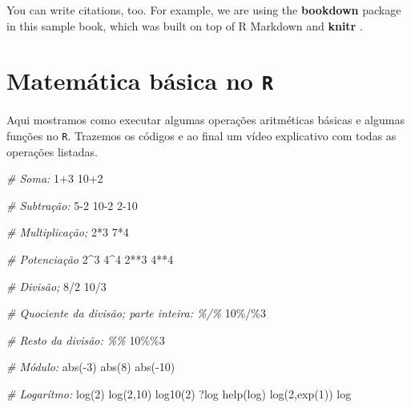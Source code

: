 \documentclass[
  brazilian,
]{book}
\newenvironment{Shaded}{\begin{snugshade}}{\end{snugshade}}
\newcommand{\CommentTok}[1]{\textcolor[rgb]{0.56,0.35,0.01}{\textit{#1}}}
\newcommand{\DecValTok}[1]{\textcolor[rgb]{0.00,0.00,0.81}{#1}}
\newcommand{\FunctionTok}[1]{\textcolor[rgb]{0.00,0.00,0.00}{#1}}
\newcommand{\NormalTok}[1]{#1}
\newcommand{\SpecialCharTok}[1]{\textcolor[rgb]{0.00,0.00,0.00}{#1}}
\begin{document}
You can write citations, too. For example, we are using the \textbf{bookdown} package \citep{R-bookdown} in this sample book, which was built on top of R Markdown and \textbf{knitr} \citep{xie2015}.

\hypertarget{matemuxe1tica-buxe1sica-no-r}{%
\chapter{\texorpdfstring{Matemática básica no \texttt{R}}{Matemática básica no R}}\label{matemuxe1tica-buxe1sica-no-r}}

Aqui mostramos como executar algumas operações aritméticas básicas e algumas funções no \texttt{R}. Trazemos os códigos e ao final um vídeo explicativo com todas as operações listadas.

\begin{Shaded}
\begin{Highlighting}[]
\CommentTok{\# Soma:}
\DecValTok{1}\SpecialCharTok{+}\DecValTok{3}
\DecValTok{10}\SpecialCharTok{+}\DecValTok{2}

\CommentTok{\# Subtração:}
\DecValTok{5{-}2}
\DecValTok{10{-}2}
\DecValTok{2{-}10}

\CommentTok{\# Multiplicação;}
\DecValTok{2}\SpecialCharTok{*}\DecValTok{3}
\DecValTok{7}\SpecialCharTok{*}\DecValTok{4}

\CommentTok{\# Potenciação}
\DecValTok{2}\SpecialCharTok{\^{}}\DecValTok{3}
\DecValTok{4}\SpecialCharTok{\^{}}\DecValTok{4}
\DecValTok{2}\SpecialCharTok{**}\DecValTok{3}
\DecValTok{4}\SpecialCharTok{**}\DecValTok{4}

\CommentTok{\# Divisão;}
\DecValTok{8}\SpecialCharTok{/}\DecValTok{2}
\DecValTok{10}\SpecialCharTok{/}\DecValTok{3}

\CommentTok{\# Quociente da divisão; parte inteira: \%/\%}
\DecValTok{10}\SpecialCharTok{\%/\%}\DecValTok{3}

\CommentTok{\# Resto da divisão: \%\%}
\DecValTok{10}\SpecialCharTok{\%\%}\DecValTok{3}

\CommentTok{\# Módulo:}
\FunctionTok{abs}\NormalTok{(}\SpecialCharTok{{-}}\DecValTok{3}\NormalTok{)}
\FunctionTok{abs}\NormalTok{(}\DecValTok{8}\NormalTok{)}
\FunctionTok{abs}\NormalTok{(}\SpecialCharTok{{-}}\DecValTok{10}\NormalTok{)}

\CommentTok{\# Logarítmo:}
\FunctionTok{log}\NormalTok{(}\DecValTok{2}\NormalTok{)}
\FunctionTok{log}\NormalTok{(}\DecValTok{2}\NormalTok{,}\DecValTok{10}\NormalTok{)}
\FunctionTok{log10}\NormalTok{(}\DecValTok{2}\NormalTok{)}
\NormalTok{?log}
\FunctionTok{help}\NormalTok{(log)}
\FunctionTok{log}\NormalTok{(}\DecValTok{2}\NormalTok{,}\FunctionTok{exp}\NormalTok{(}\DecValTok{1}\NormalTok{))}
\NormalTok{log}


\end{Highlighting}
\end{Shaded}
\end{document}
